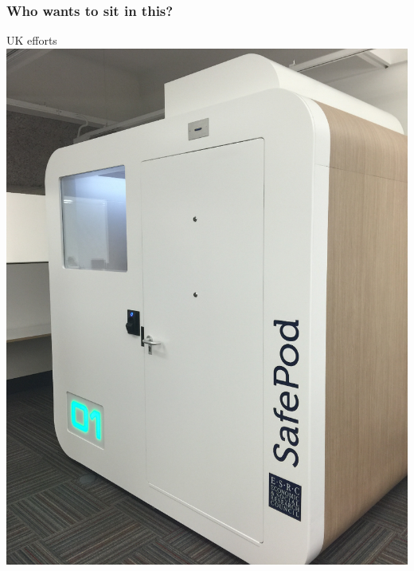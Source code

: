 \begin{frame}
	\frametitle{Who wants to sit in this?}
	\begin{block}{UK efforts}
		\centering 
		\includegraphics[height=0.8\textheight]{SafePODS}
	\end{block}
	
\end{frame}


